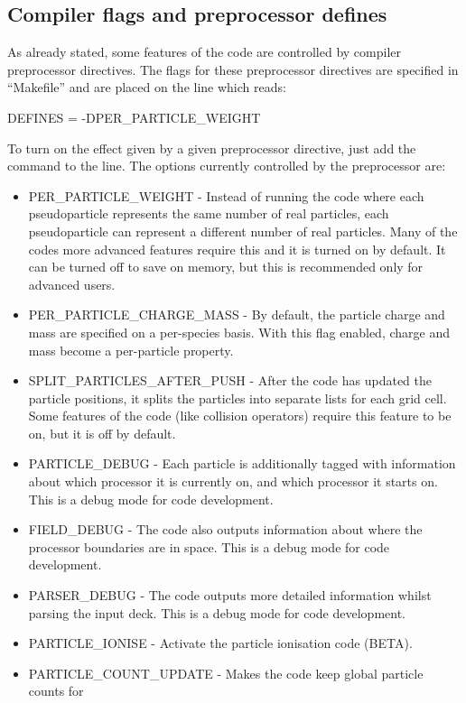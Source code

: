 \subsection{Compiler flags and preprocessor defines}
As already stated, some features of the code are controlled by compiler
preprocessor directives. The flags for these preprocessor directives are
specified in ``Makefile'' and are placed on the line which reads:
\begin{boxverbatim}
DEFINES = -DPER_PARTICLE_WEIGHT
\end{boxverbatim}
To turn on the effect given by a given preprocessor directive, just add the
command  to the  line. The
options currently controlled by the preprocessor are:\\
\begin{itemize}
\item PER\_PARTICLE\_WEIGHT - Instead of running the code where each
  pseudoparticle represents the same number of real particles, each
  pseudoparticle can represent a different number of real particles. Many of
  the codes more advanced features require this and it is turned on by
  default. It can be turned off to save on memory, but this is recommended
  only for advanced users.
\item PER\_PARTICLE\_CHARGE\_MASS - By default, the particle charge and
  mass are specified on a per-species basis. With this flag enabled, charge
  and mass become a per-particle property.
\item SPLIT\_PARTICLES\_AFTER\_PUSH - After the code has updated the particle
  positions, it splits the particles into separate lists for each grid
  cell. Some features of the code (like collision operators) require this
  feature to be on, but it is off by default.
\item PARTICLE\_DEBUG - Each particle is additionally tagged with information
  about which processor it is currently on, and which processor it starts
  on. This is a debug mode for code development.
\item FIELD\_DEBUG - The code also outputs information about where the
  processor boundaries are in space. This is a debug mode for code development.
\item PARSER\_DEBUG - The code outputs more detailed information whilst
  parsing the input deck. This is a debug mode for code development.
\item PARTICLE\_IONISE - Activate the particle ionisation code (BETA).
\item PARTICLE\_COUNT\_UPDATE - Makes the code keep global particle counts for

\end{itemize}
